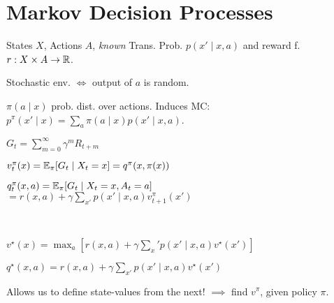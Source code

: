 \section{Markov Decision Processes}

\begin{definition}[MDP]
    States \(X\), Actions \(A\), \textit{\color{H2} known} Trans. Prob. \(p(x' \mid x, a)\) and reward f. \(r: X \times A \to \mathbb{R}\).
\end{definition}
\begin{center}
    Stochastic env. \(\iff\) output of \(a\) is random.
\end{center}

\begin{definition}[Policy]
    \(\pi(a \mid x)\) prob. dist. over actions. Induces MC:
    \(p^\pi(x'\mid x) = \sum_a \pi(a \mid x) p(x' \mid x, a)\).
\end{definition}

\begin{definition}
    \(G_t = \sum_{m=0}^\infty \gamma^m R_{t + m}\)
\end{definition}

\begin{definition}[St. V. F.]
    \(v_t^\pi(x) = \mathbb{E}_\pi[G_t \mid X_t = x] = q^\pi(x, \pi(x))\)
\end{definition}

\begin{definition}[St. V-A./Q]
    \(q_t^\pi(x, a) = \mathbb{E}_\pi[G_t \mid X_t = x, A_t = a]\) \\ \(= r(x, a) + \gamma \sum_{x'}p(x' \mid x, a) v_{t+1}^\pi(x')\)
\end{definition}

\begin{definition} \, \\
    \begin{enumerate*}
        \item {}
        \item {}
        \item {}
        \item \(v^\star(x) = \max_a[r(x, a) + \gamma \sum_x' p(x' \mid x, a) v^\star(x')]\)
        \item \(q^\star(x, a) = r(x, a) + \gamma \sum_{x'} p(x' \mid x, a) v^\star(x')\)
    \end{enumerate*}

    { \color{H1} Allows us to define state-values from the next!} \(\implies\) find \(v^\pi\), given policy \(\pi\).
\end{definition}

